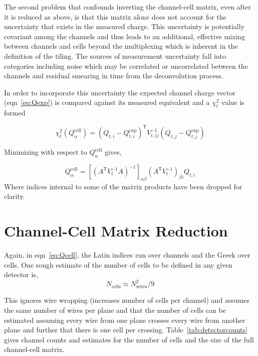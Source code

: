 \documentclass[letter]{article}
\def\mQdec{Q_{t,i}}
\def\mQexp{Q^{\mathrm{exp}}_{t,i}}
\def\mVcov{V_{t,ij}}
\def\mQcell{Q^{\mathrm{cell}}_\alpha}
\def\Qcell{$\mQcell$\xspace}
\begin{document}
The second problem that confounds inverting the channel-cell matrix,
even after it is reduced as above, is that this matrix alone does not
account for the uncertainty that exists in the measured charge.
This uncertainty is potentially covariant among the channels and thus
leads to an additional, effective mixing between channels and cells
beyond the multiplexing which is inherent in the definition of the
tiling.
The sources of measurement uncertainty fall into categories including
noise which may be correlated or uncorrelated between the channels and
residual smearing in time from the deconvolution process.

In order to incorporate this uncertainty the expected channel charge
vector (eqn~\ref{eq:Qexp}) is compared against its measured equivalent and 
a $\chi^2_t$ value is formed

\begin{equation}
  \label{eq:chi2}
  \chi^2_t(\mQcell) = (\mQdec - \mQexp)^\mathsf{T}\mVcov^{-1}(Q_{t,j} - Q^{\mathrm{exp}}_{t,j})
\end{equation}

\noindent Minimizing with respect to \Qcell gives,

\begin{equation}
  \label{eq:Qcell}
  \mQcell = [(A^\mathsf{T}V_t^{-1}A)^{-1}]_{\alpha\beta}
  (A^\mathsf{T}V_t^{-1})_{\beta i}\mQdec
\end{equation}
Where indices internal to some of the matrix products have been
dropped for clarity.

\section{Channel-Cell Matrix Reduction}
\label{sec:reduction}

Again, in eqn~\ref{eq:Qcell}, the Latin indices run over
channels and the Greek over cells.
One rough estimate of the number of cells to be defined in any given
detector is,
\begin{equation}
  \label{eq:ncellsestimate}
  N_\mathrm{cells} \approx N_\mathrm{wires}^2/9
\end{equation}

This ignores wire wrapping (increases number of cells per channel) and
assumes the same number of wires per plane and that the number of
cells can be estimated assuming every wire from one plane crosses
every wire from another plane and further that there is one cell per
crossing.
Table~\ref{tab:detectorcounts} gives channel counts and estimates for the
number of cells and the size of the full channel-cell matrix.
\end{document}
